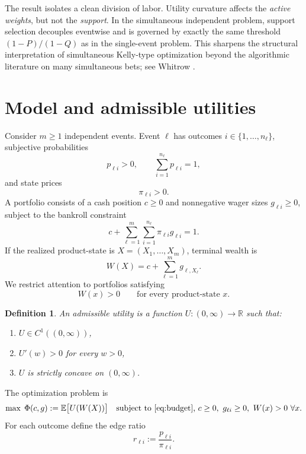 \documentclass[11pt]{article}
\newtheorem{definition}[theorem]{Definition}
\newcommand{\E}{\mathbb{E}}
\newcommand{\R}{\mathbb{R}}
\begin{document}
The result isolates a clean division of labor. Utility curvature affects the \emph{active weights}, but not the \emph{support}. In the simultaneous independent problem, support selection decouples eventwise and is governed by exactly the same threshold $(1-P)/(1-Q)$ as in the single-event problem. This sharpens the structural interpretation of simultaneous Kelly-type optimization beyond the algorithmic literature on many simultaneous bets; see Whitrow \cite{Whitrow2007}.

\section{Model and admissible utilities}
Consider $m\ge 1$ independent events. Event $\ell$ has outcomes $i\in\{1,\dots,n_\ell\}$, subjective probabilities
\[
  p_{\ell i}>0,
  \qquad
  \sum_{i=1}^{n_\ell}p_{\ell i}=1,
\]
and state prices
\[
  \pi_{\ell i}>0.
\]
A portfolio consists of a cash position $c\ge 0$ and nonnegative wager sizes $g_{\ell i}\ge 0$, subject to the bankroll constraint
\begin{equation}\label{eq:budget}
  c+\sum_{\ell=1}^m\sum_{i=1}^{n_\ell}\pi_{\ell i}g_{\ell i}=1.
\end{equation}
If the realized product-state is $X=(X_1,\dots,X_m)$, terminal wealth is
\begin{equation}\label{eq:wealth}
  W(X)=c+\sum_{\ell=1}^m g_{\ell,X_\ell}.
\end{equation}
We restrict attention to portfolios satisfying
\[
  W(x)>0 \qquad \text{for every product-state }x.
\]

\begin{definition}
An \emph{admissible utility} is a function $U:(0,\infty)\to\R$ such that:
\begin{enumerate}[label=\textup{(U\arabic*)},leftmargin=2.4em]
\item $U\in C^1((0,\infty))$,
\item $U'(w)>0$ for every $w>0$,
\item $U$ is strictly concave on $(0,\infty)$.
\end{enumerate}
\end{definition}

The optimization problem is
\begin{equation}\label{eq:mainproblem}
  \max\; \Phi(c,g):=\E\bigl[U(W(X))\bigr]
  \quad\text{subject to \eqref{eq:budget}, } c\ge 0,\ g_{\ell i}\ge 0,\ W(x)>0\ \forall x.
\end{equation}
For each outcome define the edge ratio
\begin{equation}\label{eq:edge}
  r_{\ell i}:=\frac{p_{\ell i}}{\pi_{\ell i}}.
\end{equation}
\end{document}
